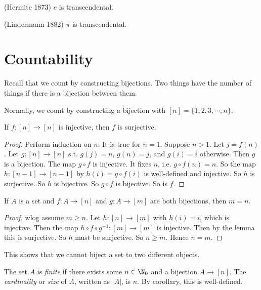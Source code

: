 \documentclass[a4paper]{article}
\begin{document}
  \begin{thm}
    (Hermite 1873) $e$ is transcendental. 
  \end{thm}
  \begin{thm}
    (Lindermann 1882) $\pi$ is transcendental.
  \end{thm}

  \section{Countability}
  Recall that we count by constructing bijections. Two things have the number of things if there is a bijection between them.

  Normally, we count by constructing a bijection with $[n] = \{1, 2, 3, \cdots, n\}$.

  \begin{lemma}
    If $f:[n] \to [n]$ is injective, then $f$ is surjective. 
  \end{lemma}

  \begin{proof}
    Perform induction on $n$: It is true for $n = 1$. Suppose $n > 1$. Let $j = f(n)$. Let $g: [n]\to [n]$ s.t. $g(j) = n$, $g(n) = j$, and $g(i) = i$ otherwise. Then $g$ is a bijection. The map $g\circ f$ is injective. It fixes $n$, i.e. $g\circ f(n) = n$. So the map $h:[n - 1]\to [n - 1]$ by $h(i) = g\circ f(i)$ is well-defined and injective. So $h$ is surjective. So $h$ is bijective. So $g\circ f$ is bijective. So is $f$.
  \end{proof}

  \begin{cor}
    If $A$ is a set and $f: A\to [n]$ and $g: A\to [m]$ are both bijections, then $m = n$.
  \end{cor}

  \begin{proof}
    wlog assume $m \geq n$. Let $h: [n]\to [m]$ with $h(i) = i$, which is injective. Then the map $h\circ f\circ g^{-1}: [m]\to [m]$ is injective. Then by the lemma this is surjective. So $h$ must be surjective. So $n\geq m$. Hence $n = m$.
  \end{proof}
  This shows that we cannot biject a set to two different objects.

  \begin{defi}
    The set $A$ is \emph{finite} if there exists some $n\in\N_0$ and a bijection $A\to [n]$. The \emph{cardinality} or \emph{size} of $A$, written as $|A|$, is $n$. By corollary, this is well-defined.
  \end{defi}
\end{document}
